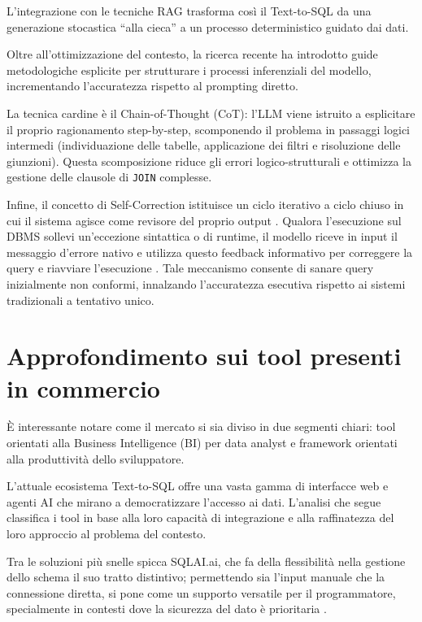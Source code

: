 L'integrazione con le tecniche RAG trasforma così il Text-to-SQL da una
generazione stocastica ``alla cieca'' a un processo deterministico
guidato dai dati.

Oltre all'ottimizzazione del contesto, la ricerca recente ha introdotto
guide metodologiche esplicite per strutturare i processi inferenziali
del modello, incrementando l'accuratezza rispetto al prompting
diretto.

La tecnica cardine è il Chain-of-Thought (CoT): l'LLM viene
istruito a esplicitare il proprio ragionamento step-by-step,
scomponendo il problema in passaggi logici intermedi (individuazione
delle tabelle, applicazione dei filtri e risoluzione delle giunzioni).
\cite{xia2025chainofthoughtsurveychainofxparadigms} Questa scomposizione riduce gli errori logico-strutturali e
ottimizza la gestione delle clausole di \texttt{JOIN} complesse.

Infine, il concetto di Self-Correction istituisce un ciclo
iterativo a ciclo chiuso in cui il sistema agisce come revisore del
proprio output \cite{gupta2024comprehensivesurveyretrievalaugmentedgeneration, rahmani2025selfcorrectinglargelanguagemodels}. Qualora l'esecuzione sul DBMS
sollevi un'eccezione sintattica o di runtime, il modello riceve in input
il messaggio d'errore nativo e utilizza questo feedback informativo per
correggere la query e riavviare l'esecuzione \cite{gupta2024comprehensivesurveyretrievalaugmentedgeneration}. Tale
meccanismo consente di sanare query inizialmente non conformi,
innalzando l'accuratezza esecutiva rispetto
ai sistemi tradizionali a tentativo unico.

\section{Approfondimento sui tool presenti in
commercio}\label{approfondimento-sui-tool-presenti-in-commercio}

È interessante notare come il mercato si sia diviso in due segmenti
chiari: tool orientati alla Business Intelligence (BI) per data analyst
e framework orientati alla produttività dello sviluppatore.

L'attuale ecosistema Text-to-SQL offre una vasta gamma di interfacce web
e agenti AI che mirano a democratizzare l'accesso ai dati. L'analisi che
segue classifica i tool in base alla loro capacità di integrazione e
alla raffinatezza del loro approccio al problema del contesto.

Tra le soluzioni più snelle spicca SQLAI.ai, che fa della flessibilità
nella gestione dello schema il suo tratto distintivo; permettendo sia
l'input manuale che la connessione diretta, si pone come un supporto
versatile per il programmatore, specialmente in contesti dove la
sicurezza del dato è prioritaria \cite{sqlai}.

